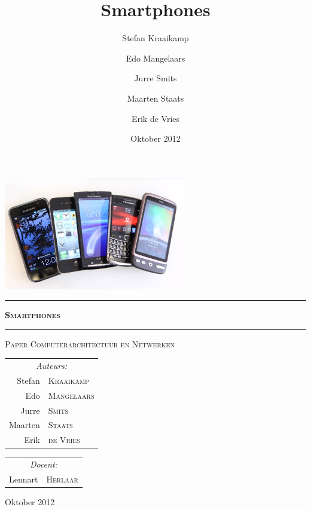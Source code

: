 \documentclass[parskip=half, fontsize=12pt, twoside, open=right, abstracton]{scrreprt}
\title{Smartphones}
\author{Stefan Kraaikamp \and Edo Mangelaars \and Jurre Smits \and Maarten Staats \and Erik de Vries}
\date{Oktober 2012}
\newcommand{\size}[1]{\fontsize{#1}{#1}\selectfont}
\begin{document}
\setlength{\intextsep}{0pt}
   
\begin{titlepage}
   \centering

   \vspace*{1cm}

   \includegraphics[width=0.6\textwidth]{smartphones.jpg}
   
   \vspace{0.5cm}

   \hrule
   {\size{32pt} \bfseries \scshape Smartphones}
   \vspace{1em}
   \hrule

   \vspace{0.5cm}

   {\Large \scshape Paper Computerarchitectuur en Netwerken}

   \vspace{2cm}

   \begin{minipage}{0.4\textwidth}\begin{flushleft}
      \large
      \begin{tabular}{rl}
      \multicolumn{2}{c}{\emph{Auteurs:}}\\
      Stefan  & \textsc{Kraaikamp}\\
      Edo     & \textsc{Mangelaars}\\
      Jurre   & \textsc{Smits}\\
      Maarten & \textsc{Staats}\\
      Erik    & \textsc{de Vries}
      \end{tabular}
   \end{flushleft}\end{minipage}
   \begin{minipage}{0.4\textwidth}\begin{flushright}
      \large
      \begin{tabular}{rl}
      \multicolumn{2}{c}{\emph{Docent:}}\\
      Lennart & \textsc{Herlaar}
      \end{tabular}
   \end{flushright}\end{minipage}

   \vfill

   Oktober 2012

\end{titlepage}



\tableofcontents















\end{document}
